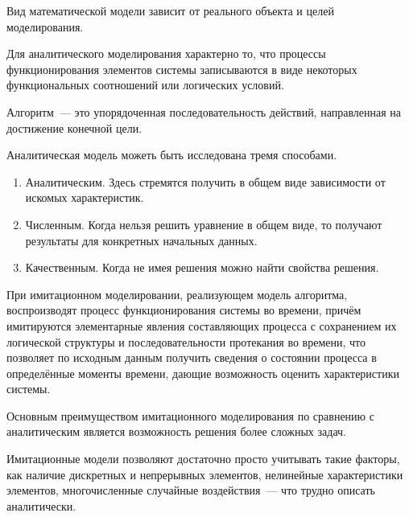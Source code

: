 Вид математической модели зависит от реального объекта и целей моделирования.

Для аналитического моделирования характерно то, что процессы функционирования элементов системы записываются в виде некоторых функциональных соотношений или логических условий.

\begin{dd}
    Алгоритм~--- это упорядоченная последовательность действий, направленная на достижение конечной цели.
\end{dd}

Аналитическая модель можеть быть исследована тремя способами.

\begin{enumerate}
    \item Аналитическим. Здесь стремятся получить в общем виде зависимости от искомых характеристик.
    \item Численным. Когда нельзя решить уравнение в общем виде, то получают результаты для конкретных начальных данных.
    \item Качественным. Когда не имея решения можно найти свойства решения.
\end{enumerate}

При имитационном моделировании, реализующем модель алгоритма, воспроизводят процесс функционирования системы во времени, причём имитируются элементарные явления составляющих процесса с сохранением их логической структуры и последовательности протекания во времени, что позволяет по исходным данным получить сведения о состоянии процесса в определённые моменты времени, дающие возможность оценить характеристики системы.

Основным преимуществом имитационного моделирования по сравнению с аналитическим является возможность решения более сложных задач.

Имитационные модели позволяют достаточно просто учитывать такие факторы, как наличие дискретных и непрерывных элементов, нелинейные характеристики элементов, многочисленные случайные воздействия~--- что трудно описать аналитически.
